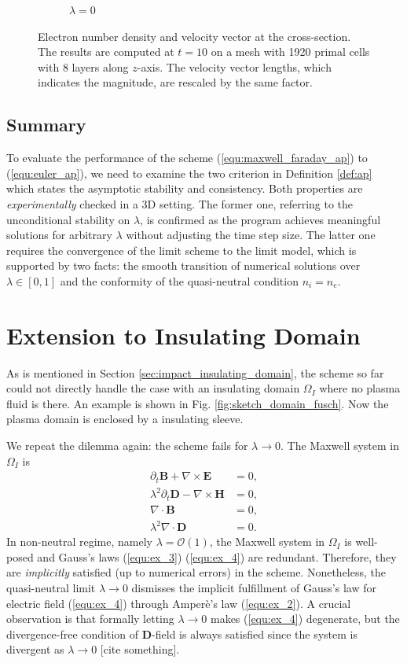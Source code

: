 \documentclass{report}
\begin{document}
\begin{figure}
\begin{subfigure}[b]{0.4\textwidth}
        \caption{$\lambda = 0$}
    \end{subfigure}
    \caption{Electron number density and velocity vector at the cross-section. The results are computed at $t = 10$ on a mesh with 1920 primal cells with 8 layers along $z$-axis. The velocity vector lengths, which indicates the magnitude, are rescaled by the same factor.}
    \label{fig:clip-ne-nue-T_10}
\end{figure}

\section{Summary}
To evaluate the performance of the scheme (\ref{equ:maxwell_faraday_ap}) to (\ref{equ:euler_ap}), we need to examine the two criterion in Definition \ref{def:ap} which states the asymptotic stability and consistency. Both properties are \emph{experimentally} checked in a 3D setting. The former one, referring to the unconditional stability on $\lambda$, is confirmed as the program achieves meaningful solutions for arbitrary $\lambda$ without adjusting the time step size. The latter one requires the convergence of the limit scheme to the limit model, which is supported by two facts: the smooth transition of numerical solutions over $\lambda \in [0,1]$ and the conformity of the quasi-neutral condition $n_i = n_e$. 

\chapter{Extension to Insulating Domain}
As is mentioned in Section \ref{sec:impact_insulating_domain}, the scheme so far could not directly handle the case with an insulating domain $\Omega_I$ where no plasma fluid is there. An example is shown in Fig. \ref{fig:sketch_domain_fusch}. Now the plasma domain is enclosed by a insulating sleeve. 

We repeat the dilemma again: the scheme fails for $\lambda \rightarrow 0$. The Maxwell system in $\Omega_I$ is    
\begin{align}
    \partial_t \mathbf{B} + \nabla \times \mathbf{E} &= 0, \label{equ:ex_1}\\ 
    \lambda^2 \partial_t \mathbf{D} - \nabla \times \mathbf{H} &= 0,  \label{equ:ex_2}\\
    \nabla \cdot \mathbf{B} &= 0, \label{equ:ex_3}\\
    \lambda^2 \nabla \cdot \mathbf{D} &= 0 \label{equ:ex_4}.
\end{align}
In non-neutral regime, namely $\lambda = \mathcal{O}(1)$, the Maxwell system in $\Omega_I$ is well-posed and Gauss's laws (\ref{equ:ex_3}) (\ref{equ:ex_4}) are redundant. Therefore, they are \emph{implicitly} satisfied (up to numerical errors) in the scheme. Nonetheless, the quasi-neutral limit $\lambda \rightarrow 0$ dismisses the implicit fulfillment of Gauss's law for electric field (\ref{equ:ex_4}) through Amper\`{e}'s law (\ref{equ:ex_2}). A crucial observation is that formally letting $\lambda \rightarrow 0$ makes (\ref{equ:ex_4}) degenerate, but the divergence-free condition of $\mathbf{D}$-field is always satisfied since the system is divergent as $\lambda \rightarrow 0$ [cite something]. 
\end{document}

